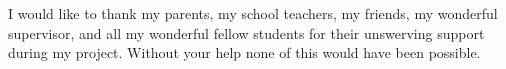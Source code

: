 I would like to thank my parents, my school teachers, my friends, my wonderful supervisor, and all
my wonderful fellow students for their unswerving support during my
project. Without your help none of this would have been possible.
